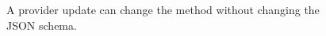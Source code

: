 \begin{figure}[H]
\centering
{}
\caption{A provider update can change the method without changing the JSON schema.}\label{fig:teach-M10-10}
\end{figure}

